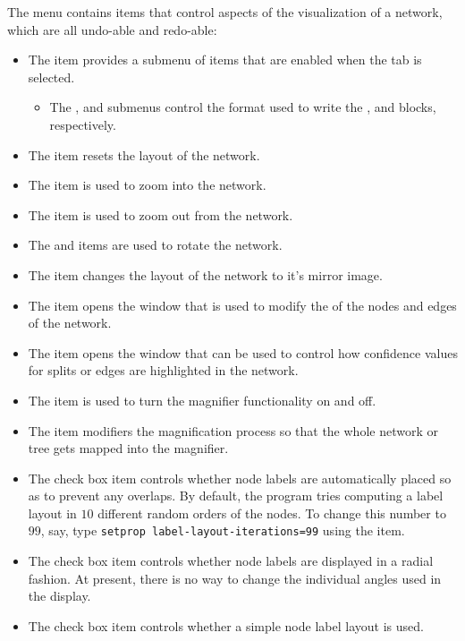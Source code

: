\documentclass[11pt]{article}
\begin{document}

The  menu contains items that control
aspects of the visualization of a network, which are all undo-able and redo-able:
\begin{itemize}
\item The  item provides a submenu of items that
are enabled when the  tab is selected.
\begin{itemize}
\item The ,  and
submenus control the format used to write the ,
 and  blocks, respectively.
\end{itemize}
\item The  item resets the layout of the network.
\item The  item is used to zoom into the network.
\item The  item is used to zoom out from the
network.
\item The 
and  items are used to rotate the network.
\item The  item changes the layout of the network
to it's mirror image.
\item The item opens the
 window that is used to modify the
 of the nodes and edges of the network.
\item The item
opens the  window that can be used to control how
confidence values for splits or edges are highlighted in the network.
\item The  item is used to turn the
magnifier functionality  on and off.
\item The  item modifiers the magnification process
so that the whole network or tree gets mapped into the magnifier.
\item The  check box item
controls whether node labels are automatically placed so as to prevent any overlaps. 
By default, the program tries computing a label layout in $10$ different
random orders of the nodes. To change this number to $99$, say,
type {\tt setprop label-layout-iterations=99}
using the  item.
\item The  check box item
controls whether node labels are displayed in a radial fashion. 
At present, there is no way to change the individual angles used in the display.
\item The  check box item
controls whether a simple node label layout is used.
\end{itemize}
\end{document}
